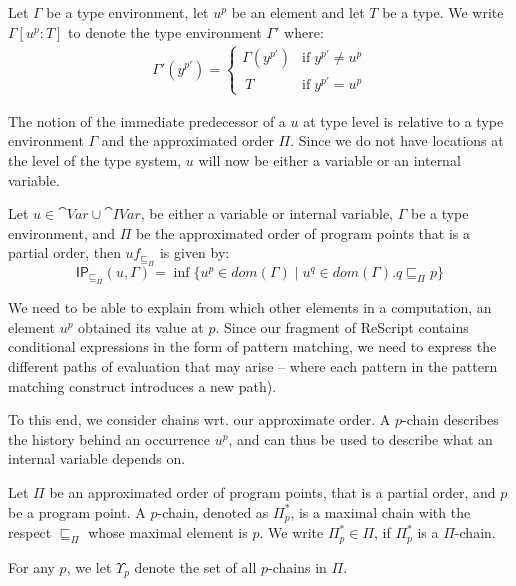 \documentclass[acmsmall,sigplan]{acmart}
\newcommand{\uf}{\ensuremath{\mathsf{IP}}}
\begin{document}
\begin{definition}
	Let $\Gamma$ be a type environment, let $u^p$ be an element
        and let $T$ be a type.
	We write $\Gamma[u^p:T]$ to denote the type environment $\Gamma'$ where:
	\begin{align*}
		\Gamma'(y^{p'})=
		\left\{\begin{matrix}
			\Gamma(y^{p'}) & \mbox{if}\;y^{p'}\neq u^{p}\\\	 
			T & \mbox{if}\;y^{p'}=u^{p}
		\end{matrix}\right.
	\end{align*}
\end{definition}

The notion of the immediate predecessor of a $u$ at type level is
relative to a type environment $\Gamma$ and the approximated order
$\Pi$. Since we do not have locations at the level of the type system,
$u$ will now be either a variable or an internal variable.

\begin{definition}\label{def:GBindPi}
	Let $u\in \cat{Var}\cup\cat{IVar}$, be either a variable or
        internal variable, $\Gamma$ be a type environment, and $\Pi$
        be the approximated order of program points that is a partial
        order, then $uf_{\sqsubseteq_\Pi}$ is given by: 
	\[ \uf_{\sqsubseteq_\Pi}(u,\Gamma)=\inf\{u^p\in
          dom(\Gamma)\mid u^q\in dom(\Gamma).q\sqsubseteq_\Pi p\} \]
\end{definition}

We need to be able to explain from which other elements in a
computation, an element $u^p$ obtained its value at $p$. Since our
fragment of ReScript contains conditional expressions in the form of
pattern matching, we need to express the different paths of evaluation
that may arise -- where each pattern in the pattern matching construct
introduces a new path).

To this end, we consider chains wrt. our approximate order. 
A $p$-chain describes the history behind an occurrence $u^p$, and can
thus be used to describe what an internal variable depends on. 

\begin{definition}[$p$-chains]
	Let $\Pi$ be an approximated order of program points, that is a partial order, and $p$ be a program point.
A $p$-chain, denoted as $\Pi_p^{*}$, is a maximal chain with the
respect $\sqsubseteq_\Pi$ whose maximal
element is $p$. We write $\Pi_p^{*}\in\Pi$, if $\Pi_p^{*}$ is a
$\Pi$-chain.

For any $p$, we let $\Upsilon_p$ denote the set of all $p$-chains in
$\Pi$.
\end{definition}
\end{document}
